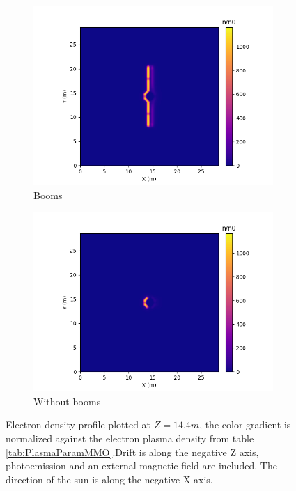 \begin{figure}[H]
  \begin{subfigure}[b]{0.6\textwidth}
  \includegraphics[width=\textwidth]{figures/MMO/BField/WB/E_BField_WB.png}
  \caption{Booms}
  \label{fig:E_BField_WB}
\end{subfigure}
\begin{subfigure}[b]{0.6\textwidth}
  \includegraphics[width=\textwidth]{figures/MMO/BField/NB/E_BField_NB.png}
  \caption{Without booms}
  \label{fig:E_BField_NB}
\end{subfigure}
\caption{Electron density profile plotted at $Z = 14.4 m$, the color gradient is normalized against the electron plasma density from table \ref{tab:PlasmaParamMMO}.Drift is along the negative Z axis, photoemission and an external magnetic field are included. The direction of the sun is along the negative X axis.}
\label{fig:Electrons_BField}
\end{figure}

